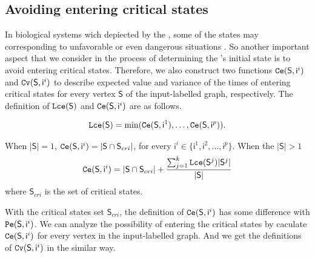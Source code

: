 \subsection{Avoiding entering critical states}
In biological systems wich depiected by the \BCNs, some of the states may corresponding to unfavorable or even dangerous situations \cite{Li2014Controllability}. So another important aspect that we consider in the process of determining the \BCN's initial state is to avoid entering critical states. Therefore, we also construct two functions ${\tt Ce}(\mathsf{S}, \mathsf{ i}^{i})$ and ${\tt Cv}(\mathsf{S}, \mathsf{ i}^{i})$ to describe expected value and variance of the times of entering critical states for every vertex $\mathsf{S}$ of the input-labelled graph, respectively. The definition of ${\tt Lce}(\mathsf{S})$ and ${\tt Ce}(\mathsf{S}, \mathsf{ i}^{i})$ are as follows.\\
\begin{definition} \label{lce}
\begin{equation}
\begin{split}
{\tt Lce}(\mathsf{S})= \min({\tt Ce}(\mathsf{S}, \mathsf{ i}^{1}),\ldots,{\tt Ce}(\mathsf{S}, \mathsf{ i}^{p})).
\end{split}
\end{equation}
\end{definition}
\begin{definition} 
When $|\mathsf{S}|=1$, ${\tt Ce}(\mathsf{S}, \mathsf{ i}^{i})=|\mathsf{S} \cap \mathsf{S}_{cri} |$, for every $\mathsf{ i}^{i} \in \{\mathsf{ i}^{1},\mathsf{ i}^{2},\ldots, \mathsf{ i}^{p}\}$.  
When the $|\mathsf{S}|>1$ 
\begin{equation}
\begin{split}
{\tt Ce}(\mathsf{S}, \mathsf{ i}^{i})=|\mathsf{S} \cap \mathsf{S}_{cri}| +\frac{\sum_{j=1}^k {\tt Lce}(\mathsf{S}^{j})|\mathsf{S}^{j}|}{ |\mathsf{S}|} 
\end{split}
\end{equation}
where $\mathsf{S}_{cri}$ is the set of critical states.
\end{definition}

With the critical states set $\mathsf{S}_{cri}$, the definition of ${\tt Ce}(\mathsf{S}, \mathsf{ i}^{i})$ has some difference with ${\tt Pe}(\mathsf{S}, \mathsf{ i}^{i})$. We can analyze the possibility of entering the critical states by caculate ${\tt Ce}(\mathsf{S}, \mathsf{ i}^{i})$ for every vertex in the input-labelled graph. And we get the definitions of ${\tt Cv}(\mathsf{S}, \mathsf{ i}^{i})$ in the similar way.

